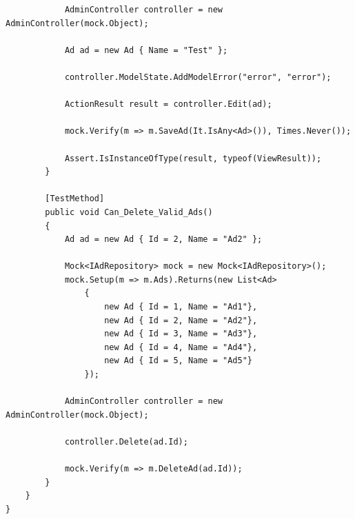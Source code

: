 \documentclass[14pt,a4paper]{extreport}
\begin{document}
\begin{lstlisting}
            AdminController controller = new AdminController(mock.Object);

            Ad ad = new Ad { Name = "Test" };

            controller.ModelState.AddModelError("error", "error");

            ActionResult result = controller.Edit(ad);

            mock.Verify(m => m.SaveAd(It.IsAny<Ad>()), Times.Never());

            Assert.IsInstanceOfType(result, typeof(ViewResult));
        }

        [TestMethod]
        public void Can_Delete_Valid_Ads()
        {
            Ad ad = new Ad { Id = 2, Name = "Ad2" };

            Mock<IAdRepository> mock = new Mock<IAdRepository>();
            mock.Setup(m => m.Ads).Returns(new List<Ad>
                {
                    new Ad { Id = 1, Name = "Ad1"},
                    new Ad { Id = 2, Name = "Ad2"},
                    new Ad { Id = 3, Name = "Ad3"},
                    new Ad { Id = 4, Name = "Ad4"},
                    new Ad { Id = 5, Name = "Ad5"}
                });

            AdminController controller = new AdminController(mock.Object);

            controller.Delete(ad.Id);

            mock.Verify(m => m.DeleteAd(ad.Id));
        }
    }
}


	\end{lstlisting}
	
\end{document}
